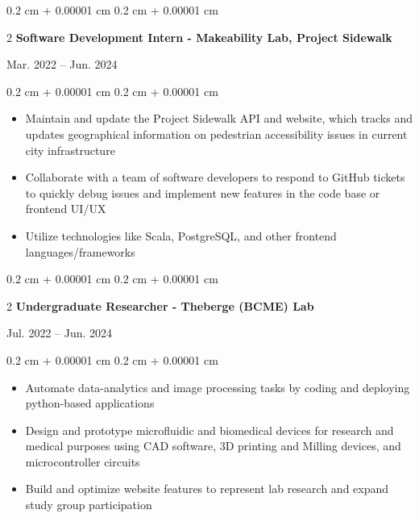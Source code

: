 \documentclass[10pt, letterpaper]{article}
\newenvironment{highlightsforbulletentries}{
    \begin{itemize}[
        topsep=0.10 cm,
        parsep=0.10 cm,
        partopsep=0pt,
        itemsep=0pt,
        leftmargin=10pt
    ]
}{
    \end{itemize}
} %
\newenvironment{onecolentry}{
    \begin{adjustwidth}{
        0.2 cm + 0.00001 cm
    }{
        0.2 cm + 0.00001 cm
    }
}{
    \end{adjustwidth}
} %
\newenvironment{twocolentry}[2][]{
    \onecolentry
    \def\secondColumn{#2}
    \setcolumnwidth{\fill, 4.5 cm}
    \begin{paracol}{2}
}{
    \switchcolumn \raggedleft \secondColumn
    \end{paracol}
    \endonecolentry
} %
\begin{document}
        \begin{twocolentry}{
            Mar. 2022 – Jun. 2024
        }{
            \textbf{Software Development Intern - Makeability Lab, Project Sidewalk}
        }
        \end{twocolentry}
        \vspace{0.1 cm}
        \begin{onecolentry}
            \begin{highlightsforbulletentries}
                \item Maintain and update the Project Sidewalk API and website, which tracks and updates geographical
                information on pedestrian accessibility issues in current city infrastructure
                \item Collaborate with a team of software developers to respond to GitHub tickets to quickly debug
                issues and implement new features in the code base or frontend UI/UX
                \item Utilize technologies like Scala, PostgreSQL, and other frontend languages/frameworks
            \end{highlightsforbulletentries}
        \end{onecolentry}

        \vspace{0.2 cm}

        \begin{twocolentry}{
            Jul. 2022 – Jun. 2024
        }{
            \textbf{Undergraduate Researcher - Theberge (BCME) Lab}
        }
        \end{twocolentry}
        \vspace{0.1 cm}
        \begin{onecolentry}
            \begin{highlightsforbulletentries}
                \item Automate data-analytics and image processing tasks by coding and deploying python-based
                applications
                \item Design and prototype microfluidic and biomedical devices for research and medical purposes using
                CAD software, 3D printing and Milling devices, and microcontroller circuits
                \item Build and optimize website features to represent lab research and expand study group participation
            \end{highlightsforbulletentries}
        \end{onecolentry}
\end{document}
